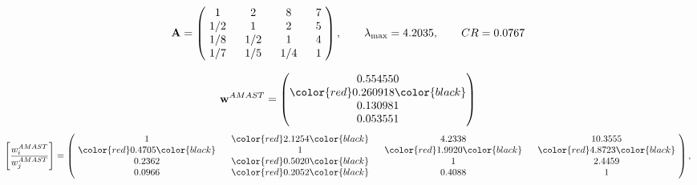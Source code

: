 \begin{example}
\begin{equation*}
\mathbf{A} =
\begin{pmatrix}
$\,\,$ 1 $\,\,$ & $\,\,$2$\,\,$ & $\,\,$8$\,\,$ & $\,\,$7 $\,\,$ \\
$\,\,$ 1/2$\,\,$ & $\,\,$ 1 $\,\,$ & $\,\,$2$\,\,$ & $\,\,$5 $\,\,$ \\
$\,\,$ 1/8$\,\,$ & $\,\,$ 1/2$\,\,$ & $\,\,$ 1 $\,\,$ & $\,\,$4 $\,\,$ \\
$\,\,$ 1/7$\,\,$ & $\,\,$ 1/5$\,\,$ & $\,\,$ 1/4$\,\,$ & $\,\,$ 1  $\,\,$ \\
\end{pmatrix},
\qquad
\lambda_{\max} =
4.2035,
\qquad
CR = 0.0767
\end{equation*}

\begin{equation*}
\mathbf{w}^{AMAST} =
\begin{pmatrix}
0.554550\\
\color{red} 0.260918\color{black} \\
0.130981\\
0.053551
\end{pmatrix}\end{equation*}
\begin{equation*}
\left[ \frac{{w}^{AMAST}_i}{{w}^{AMAST}_j} \right] =
\begin{pmatrix}
$\,\,$ 1 $\,\,$ & $\,\,$\color{red} 2.1254\color{black} $\,\,$ & $\,\,$4.2338$\,\,$ & $\,\,$10.3555$\,\,$ \\
$\,\,$\color{red} 0.4705\color{black} $\,\,$ & $\,\,$ 1 $\,\,$ & $\,\,$\color{red} 1.9920\color{black} $\,\,$ & $\,\,$\color{red} 4.8723\color{black}   $\,\,$ \\
$\,\,$0.2362$\,\,$ & $\,\,$\color{red} 0.5020\color{black} $\,\,$ & $\,\,$ 1 $\,\,$ & $\,\,$2.4459 $\,\,$ \\
$\,\,$0.0966$\,\,$ & $\,\,$\color{red} 0.2052\color{black} $\,\,$ & $\,\,$0.4088$\,\,$ & $\,\,$ 1  $\,\,$ \\
\end{pmatrix},
\end{equation*}


\end{example}
